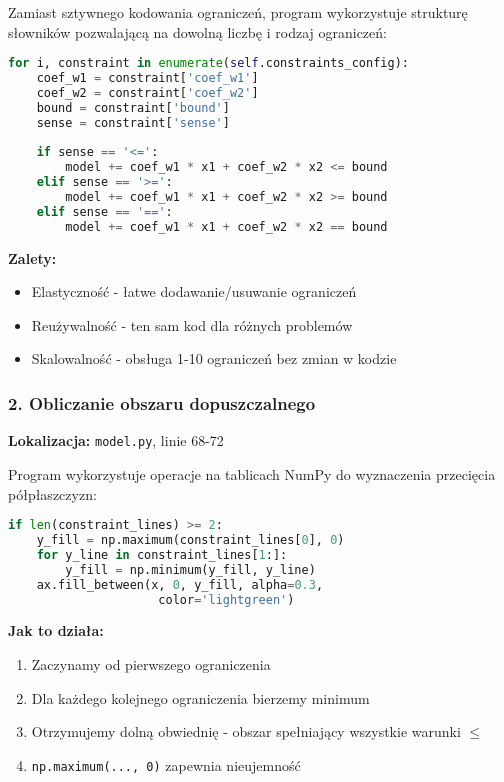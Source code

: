 \documentclass[12pt,a4paper]{article}
\begin{document}
\begin{enumerate}
Zamiast sztywnego kodowania ograniczeń, program wykorzystuje strukturę słowników pozwalającą na dowolną liczbę i rodzaj ograniczeń:

\begin{lstlisting}[language=Python]
for i, constraint in enumerate(self.constraints_config):
    coef_w1 = constraint['coef_w1']
    coef_w2 = constraint['coef_w2']
    bound = constraint['bound']
    sense = constraint['sense']
    
    if sense == '<=':
        model += coef_w1 * x1 + coef_w2 * x2 <= bound
    elif sense == '>=':
        model += coef_w1 * x1 + coef_w2 * x2 >= bound
    elif sense == '==':
        model += coef_w1 * x1 + coef_w2 * x2 == bound
\end{lstlisting}

\textbf{Zalety:}
\begin{itemize}
    \item Elastyczność - łatwe dodawanie/usuwanie ograniczeń
    \item Reużywalność - ten sam kod dla różnych problemów
    \item Skalowalność - obsługa 1-10 ograniczeń bez zmian w kodzie
\end{itemize}

\subsubsection{2. Obliczanie obszaru dopuszczalnego}

\textbf{Lokalizacja:} \texttt{model.py}, linie 68-72

Program wykorzystuje operacje na tablicach NumPy do wyznaczenia przecięcia półpłaszczyzn:

\begin{lstlisting}[language=Python]
if len(constraint_lines) >= 2:
    y_fill = np.maximum(constraint_lines[0], 0)
    for y_line in constraint_lines[1:]:
        y_fill = np.minimum(y_fill, y_line)
    ax.fill_between(x, 0, y_fill, alpha=0.3, 
                     color='lightgreen')
\end{lstlisting}

\textbf{Jak to działa:}
\begin{enumerate}
    \item Zaczynamy od pierwszego ograniczenia
    \item Dla każdego kolejnego ograniczenia bierzemy minimum
    \item Otrzymujemy dolną obwiednię - obszar spełniający wszystkie warunki $\leq$
    \item \texttt{np.maximum(..., 0)} zapewnia nieujemność
\end{enumerate}


\end{enumerate}
\end{document}
